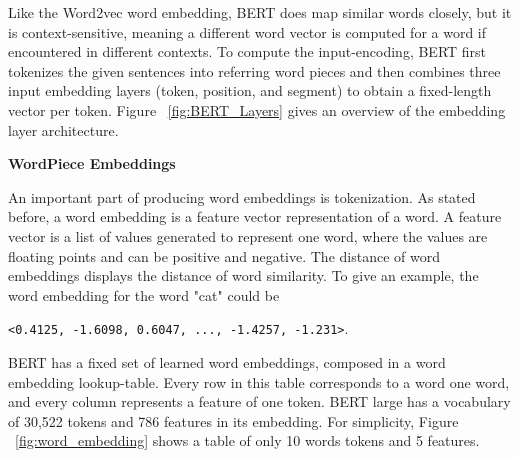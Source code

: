 Like the Word2vec word embedding, BERT does map similar words closely, but it is context-sensitive, meaning a different word vector is computed for a word if encountered in different contexts.
To compute the input-encoding, BERT first tokenizes the given sentences into referring word pieces and then combines three input embedding layers (token, position, and segment) to obtain a fixed-length vector per token. Figure ~\ref{fig:BERT_Layers} gives an overview of the embedding layer architecture.

\textbf{WordPiece Embeddings}

An important part of producing word embeddings is tokenization. As stated before, a word embedding is a feature vector representation of a word. A feature vector is a list of values generated to represent one word, where the values are floating points and can be positive and negative. The distance of word embeddings displays the distance of word similarity. To give an example, the word embedding for the word "cat" could be

\texttt{<0.4125, -1.6098, 0.6047, ..., -1.4257, -1.231>}.


BERT has a fixed set of learned word embeddings, composed in a word embedding lookup-table. Every row in this table corresponds to a word one word, and every column represents a feature of one token.
BERT large has a vocabulary of 30,522 tokens and 786 features in its embedding. For simplicity, Figure ~\ref{fig:word_embedding} shows a table of only 10 words tokens and 5 features.

